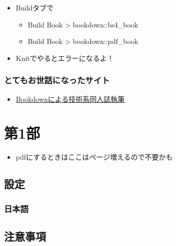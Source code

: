 \documentclass[
  xelatex,ja=standard, b5paper]{bxjsbook}
\providecommand{\tightlist}{%
  \setlength{\itemsep}{0pt}\setlength{\parskip}{0pt}}
\begin{document}
\begin{itemize}
\tightlist
\item
  Buildタブで

  \begin{itemize}
  \tightlist
  \item
    Build Book \textgreater{} bookdown::bs4\_book
  \item
    Build Book \textgreater{} bookdown::pdf\_book
  \end{itemize}
\item
  Knitでやるとエラーになるよ！
\end{itemize}

\hypertarget{ux3068ux3066ux3082ux304aux4e16ux8a71ux306bux306aux3063ux305fux30b5ux30a4ux30c8}{%
\section*{とてもお世話になったサイト}\label{ux3068ux3066ux3082ux304aux4e16ux8a71ux306bux306aux3063ux305fux30b5ux30a4ux30c8}}

\begin{itemize}
\tightlist
\item
  \href{https://teastat.blogspot.com/2019/01/bookdown.html}{Bookdownによる技術系同人誌執筆}
\end{itemize}

\hypertarget{haiiro}{%
\part{第1部}\label{haiiro}}

\begin{itemize}
\tightlist
\item
  pdfにするときはここはページ増えるので不要かも
\end{itemize}

\hypertarget{setting}{%
\chapter{設定}\label{setting}}

\hypertarget{setting_japanese}{%
\section{日本語}\label{setting_japanese}}

\hypertarget{caution}{%
\chapter{注意事項}\label{caution}}
\end{document}
